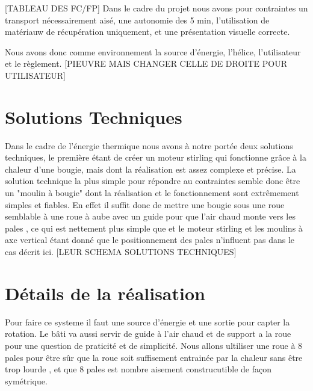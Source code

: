 \documentclass[a4paper,12pt]{article}
\begin{document}
[TABLEAU DES FC/FP]
Dans le cadre du projet nous avons pour contraintes  un transport nécessairement aisé, une autonomie des 5 min, l'utilisation de matériauw de récupération uniquement, et une présentation visuelle correcte.

Nous avons donc comme environnement la source d'énergie, l'hélice, l'utilisateur et le règlement.
[PIEUVRE MAIS CHANGER CELLE DE DROITE POUR UTILISATEUR]

\section{Solutions Techniques}
Dans le cadre de l'énergie thermique nous avons à notre portée deux solutions techniques, le première étant de créer un moteur stirling qui fonctionne grâce à la chaleur d'une bougie, mais dont la réalisation est assez complexe et précise. La solution technique la plus simple pour répondre au contraintes semble donc être un "moulin à bougie" dont la réalisation et le fonctionnement sont extrêmement simples et fiables. En effet il suffit donc de mettre une bougie sous une roue semblable à une roue à aube avec un guide pour que l'air chaud monte vers les pales , ce qui est nettement plus simple que et le moteur stirling et les moulins à axe vertical étant donné que le positionnement des pales n'influent pas dans le cas décrit ici.
[LEUR SCHEMA SOLUTIONS TECHNIQUES]

  \section{Détails de la réalisation}
  Pour faire ce systeme il faut une source d'énergie et une sortie pour capter la rotation. Le bâti va aussi servir de guide à l'air chaud et de support a la roue pour une question de praticité et de simplicité. Nous allons ultiliser une roue à 8 pales pour être sûr que la roue soit suffisement entrainée par la chaleur sans être trop lourde , et que 8 pales est nombre aisement construcutible de façon symétrique.
\end{document}
